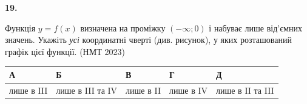 \documentclass[14pt]{extarticle}
\newcommand{\answerTableTall}[5]{
\begin{center}
\begin{tabular}{|*{5}{>{\centering\arraybackslash}m{2.8cm}|}}
\hline
\rule[-0.3cm]{0pt}{0.8cm}\textbf{А} & \textbf{Б} & \textbf{В} & \textbf{Г} & \textbf{Д} \\
\hline
\rule[-0.9cm]{0pt}{2.0cm}#1 & 
\rule[-0.9cm]{0pt}{2.0cm}#2 & 
\rule[-0.9cm]{0pt}{2.0cm}#3 & 
\rule[-0.9cm]{0pt}{2.0cm}#4 & 
\rule[-0.9cm]{0pt}{2.0cm}#5 \\
\hline
\end{tabular}
\end{center}
}
\newcommand{\nmtyear}[1]{\hfill{\small\color{yearcolor}(НМТ #1)}}
\begin{document}
\noindent\textbf{19.} \begin{minipage}[t]{0.55\textwidth}
Функція $y=f(x)$ визначена на проміжку $(-\infty; 0)$ і набуває лише від’ємних значень. Укажіть \textit{усі} координатні чверті (див. рисунок), у яких розташований графік цієї функції. \nmtyear{2023}
\end{minipage}
\hfill
\begin{minipage}[t]{0.4\textwidth}
    \vspace{-0.5cm}
    \begin{flushright}
    \end{flushright}
\end{minipage}

\vspace{0.3cm}
\answerTableTall{лише в III}{лише в III та IV}{лише в II}{лише в IV}{лише в II та III}

\vspace{0.7cm}

\end{document}
